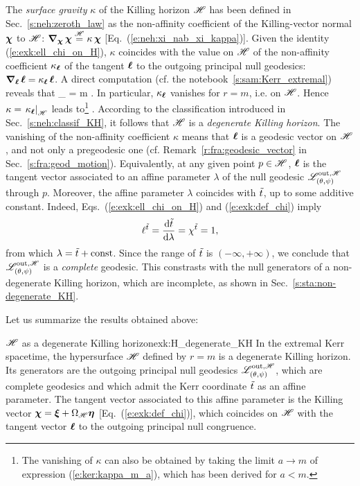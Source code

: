 The \emph{surface gravity} $\kappa$ of the Killing horizon $\mathscr{H}$
has been defined in Sec.~\ref{s:neh:zeroth_law} as the non-affinity coefficient of the Killing-vector normal $\bm{\chi}$ to $\mathscr{H}$:
$\bm{\nabla}_{\bm{\chi}}\, \bm{\chi} \stackrel{\mathscr{H}}{=} \kappa \, \bm{\chi}$ [Eq.~(\ref{e:neh:xi_nab_xi_kappa})].
Given the identity (\ref{e:exk:ell_chi_on_H}), $\kappa$ coincides with the value on $\mathscr{H}$ of the
non-affinity coefficient $\kappa_{\bm{\ell}}$ of the tangent $\bm{\ell}$ to the outgoing principal null
geodesics: $\bm{\nabla}_{\bm{\ell}}\, \bm{\ell} = \kappa_{\bm{\ell}}\, \bm{\ell}$. A direct computation (cf. the notebook~\ref{s:sam:Kerr_extremal}) reveals that
\be
    \kappa_{\wl} = m  .
\ee
In particular, $\kappa_{\bm{\ell}}$ vanishes for $r=m$, i.e. on $\mathscr{H}$.
Hence $\kappa = \left. \kappa_{\bm{\ell}} \right| _{\mathscr{H}}$ leads to\footnote{The vanishing of $\kappa$ can also be obtained
by taking the limit $a\to m$ of expression (\ref{e:ker:kappa_m_a}), which has been derived for $a<m$.}
\be
     .
\ee
According to the classification introduced in Sec.~\ref{s:neh:classif_KH}, it follows
that $\mathscr{H}$ is a \emph{degenerate Killing horizon}.
The vanishing of the non-affinity coefficient $\kappa$ means that $\bm{\ell}$ is a geodesic vector
on $\mathscr{H}$, and not only a pregeodesic  one (cf. Remark~\ref{r:fra:geodesic_vector} in Sec.~\ref{s:fra:geod_motion}). Equivalently, at any given point $p\in\mathscr{H}$,
$\bm{\ell}$ is the tangent vector associated to
an affine parameter $\lambda$ of the null geodesic $\mathscr{L}^{{\rm out},\mathscr{H}}_{(\theta,\psi)}$ through $p$.
Moreover, the affine parameter $\lambda$ coincides with ${\tilde t}$,
up to some additive constant. Indeed,
Eqs.~(\ref{e:exk:ell_chi_on_H}) and (\ref{e:exk:def_chi}) imply
\[
     \ell^{{\tilde t}} = \frac{\mathrm{d} {\tilde t}}{\mathrm{d} \lambda} = \chi^{{\tilde t}} = 1 ,
\]
from which $\lambda = {\tilde t} + \mathrm{const}$.
Since the range of ${\tilde t}$ is $(-\infty, +\infty)$, we conclude that
$\mathscr{L}^{{\rm out},\mathscr{H}}_{(\theta,\psi)}$ is a \emph{complete} geodesic. This constrasts
with the null generators of a non-degenerate Killing horizon, which are
incomplete, as shown in Sec.~\ref{s:sta:non-degenerate_KH}.

Let us summarize the results obtained above:
\begin{tprop}{$\mathscr{H}$ as a degenerate Killing horizon}{exk:H_degenerate_KH}
In the extremal Kerr spacetime, the hypersurface $\mathscr{H}$ defined
by $r=m$ is a degenerate Killing horizon.
Its generators are the outgoing principal null geodesics
$\mathscr{L}^{{\rm out},\mathscr{H}}_{(\theta,\psi)}$, which are complete geodesics
and which admit the Kerr coordinate
${\tilde t}$ as an affine parameter. The tangent vector associated to this affine
parameter is the Killing vector $\bm{\chi} = \bm{\xi} + \Omega_{\mathscr{H}} \bm{\eta}$
[Eq.~(\ref{e:exk:def_chi})], which coincides on $\mathscr{H}$ with the tangent
vector $\bm{\ell}$ to the outgoing principal null congruence.
\end{tprop}

